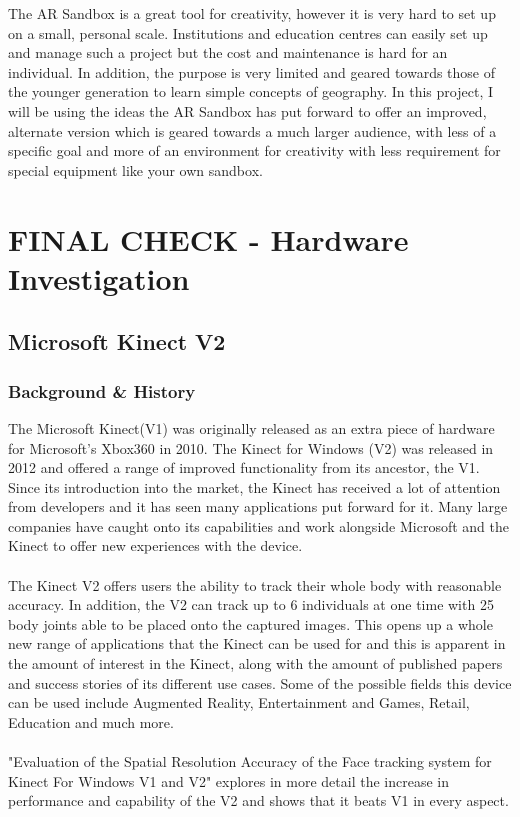 \documentclass[11pt]{article}
\begin{document}
The AR Sandbox is a great tool for creativity, however it is very hard to set up
on a small, personal scale. Institutions and education centres can easily set
up and manage such a project but the cost and maintenance is hard for an
individual. In addition, the purpose is very limited and geared towards those
of the younger generation to learn simple concepts of geography. In this project,
I will be using the ideas the AR Sandbox has put forward to offer an
improved, alternate version which is geared towards a much larger audience, with
less of a specific goal and more of an environment for creativity with less
requirement for special equipment like your own sandbox.

\section{FINAL CHECK - Hardware Investigation}
\subsection{Microsoft Kinect V2}
\subsubsection{Background \& History}
The Microsoft Kinect(V1) was originally released as an extra piece of hardware
for Microsoft's Xbox360 in 2010. The Kinect for Windows (V2) was released
in 2012 and offered a range of improved functionality from its ancestor, the
V1. Since its introduction into the market, the Kinect has received a lot of
attention from developers and it has seen many applications put forward for 
it. Many large companies have caught onto its capabilities and work 
alongside Microsoft and the Kinect to offer new experiences with the device.\\ 
\\
The Kinect V2 offers users the ability to track their
whole body with reasonable accuracy. In addition, the V2 can track up to 6 individuals
at one time with 25 body joints able to be placed onto the captured images.
This opens up a whole new range of applications
that the Kinect can be used for and this is apparent in the amount of interest in the
Kinect, along with the amount of published papers and success stories of 
its different use cases.
Some of the possible fields this device can be used include 
Augmented Reality, Entertainment and Games, Retail, Education and much more.\\
\\ 
"Evaluation of the Spatial Resolution Accuracy of the Face 
tracking system for Kinect For Windows V1 and V2" \cite{AmonFuhrmann14}
explores in more detail the increase in performance and capability
of the V2 and shows that it beats V1 in every aspect. 
\end{document}
